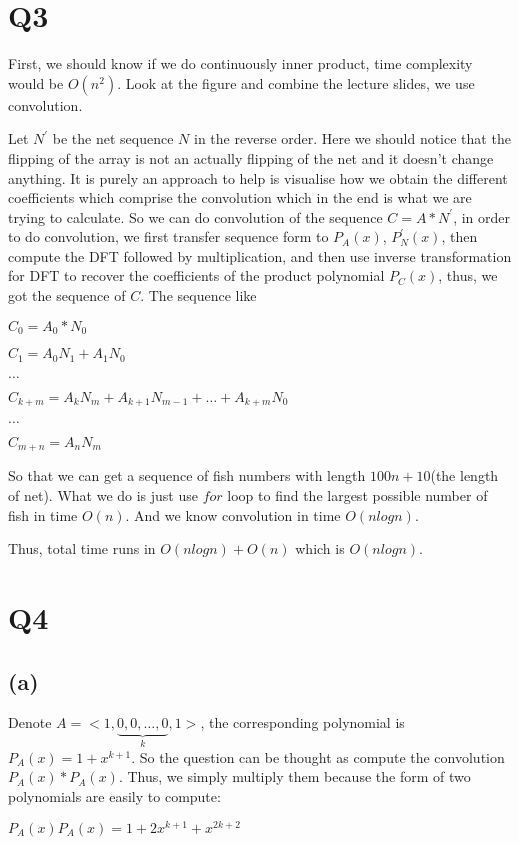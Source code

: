 \documentclass[a4paper]{article}
\begin{document}
	\section*{Q3}
	First, we should know if we do continuously inner product, time complexity would be $O(n^2)$.
	Look at the figure and combine the lecture slides, we use convolution.
	
	Let $N^{'}$ be the net sequence $N$ in the reverse order. Here we should notice that the flipping of the array is not an actually flipping of the net and it doesn't change anything. It is purely an approach to help is visualise how we obtain the different coefficients which comprise the convolution which in the end is what we are trying to calculate. So we can do convolution of the sequence $C = A * N^{'}$, in order to do convolution, we first transfer sequence form to $P_A(x)$, $P_N^{'}(x)$, then compute the DFT followed by multiplication, and then use inverse transformation for DFT to recover the coefficients of the product polynomial $P_C(x)$, thus, we got the sequence of $C$. The sequence like 
	
	$C_0 = A_0*N_0$
	
	$C_1 = A_0N_1+A_1N_0$
	
	$ \dots $
	
	$C_{k+m}=A_kN_m+A_{k+1}N_{m-1}+\dots+A_{k+m}N_0$ 
	
	$\dots$ 
	
	$C_{m+n}=A_nN_m$
	
	So that we can get a sequence of fish numbers with length $100n+10$(the length of net). What we do is just use $for$ loop to find the largest possible number of fish in time $O(n)$. And we know convolution in time $O(nlog n)$.
	
	Thus, total time runs in $O(nlog n) + O(n)$ which is $O(nlog n)$. 
	
	\section*{Q4}
	\subsection*{(a)}
	Denote $A = <1,\underbrace{0,0,\dots,0}_{k},1>$, the corresponding polynomial is $P_A(x) = 1 + x^{k+1}$. So the question can be thought as compute the convolution $P_A(x) * P_A(x)$. Thus, we simply multiply them because the form of two polynomials are easily to compute:
	
	$P_A(x)P_A(x)=1+2x^{k+1}+x^{2k+2}$
	
\end{document}
